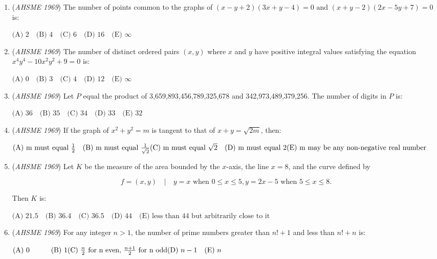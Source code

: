 \begin{enumerate}
	\item (\textit{AHSME 1969}) The number of points common to the graphs of
$(x-y+2)(3x+y-4)=0 \text{    and     } (x+y-2)(2x-5y+7)=0$
is:


 $\text{(A) } 2\quad \text{(B) } 4\quad \text{(C) } 6\quad \text{(D) } 16\quad \text{(E) } \infty$


	\item (\textit{AHSME 1969}) The number of distinct ordered pairs $(x,y)$ where $x$ and $y$ have positive integral values satisfying the equation $x^4y^4-10x^2y^2+9=0$ is:


 $\text{(A) } 0\quad \text{(B) } 3\quad \text{(C) } 4\quad \text{(D) } 12\quad \text{(E) } \infty$


	\item (\textit{AHSME 1969}) Let $P$ equal the product of 3,659,893,456,789,325,678 and 342,973,489,379,256. The number of digits in $P$ is:


 $\text{(A) } 36\quad \text{(B) } 35\quad \text{(C) } 34\quad \text{(D) } 33\quad \text{(E) } 32$


	\item (\textit{AHSME 1969}) If the graph of $x^2+y^2=m$ is tangent to that of $x+y=\sqrt{2m}$, then:


 $\text{(A) m must equal } \frac{1}{2}\quad \text{(B) m must equal  } \frac{1}{\sqrt{2}}\quad\\ \text{(C) m must equal } \sqrt{2}\quad \text{(D) m must equal } 2\quad\\ \text{(E) m may be any non-negative real number}$


	\item (\textit{AHSME 1969}) Let $K$ be the measure of the area bounded by the $x$-axis, the line $x=8$, and the curve defined by


 
 \[f={(x,y)\quad |\quad y=x \text{  when  } 0 \le x \le 5, y=2x-5 \text{  when  } 5 \le x \le 8}.\]


 Then $K$ is:


 $\text{(A) } 21.5\quad \text{(B) } 36.4\quad \text{(C) } 36.5\quad \text{(D) } 44\quad \text{(E) less than 44 but arbitrarily close to it}$


	\item (\textit{AHSME 1969}) For any integer $n>1$, the number of prime numbers greater than $n!+1$ and less than $n!+n$ is:


 $\text{(A) } 0\quad\qquad \text{(B) } 1\quad\\ \text{(C) } \frac{n}{2} \text{ for n even, } \frac{n+1}{2} \text{ for n odd}\quad\\ \text{(D) } n-1\quad \text{(E) } n$



\end{enumerate}
